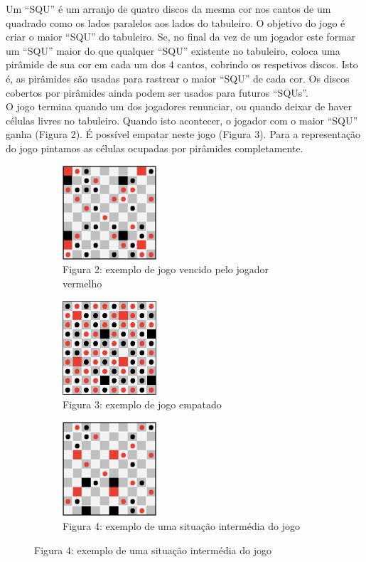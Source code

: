 \documentclass[11pt]{article}
\begin{document}
Um “SQU” é um arranjo de quatro discos da mesma cor nos cantos de um quadrado como os lados paralelos aos lados do tabuleiro. O objetivo do jogo é criar o maior “SQU” do tabuleiro. Se, no final da vez de um jogador este formar um “SQU” maior do que qualquer “SQU” existente no tabuleiro, coloca uma pirâmide de sua cor em cada um dos 4 cantos, cobrindo os respetivos discos. Isto é, as pirâmides são usadas para rastrear o maior “SQU” de cada cor. Os discos cobertos por pirâmides ainda podem ser usados para futuros “SQUs”.\\

O jogo termina quando um dos jogadores renunciar, ou quando deixar de haver células livres no tabuleiro. Quando isto acontecer, o jogador com o maior “SQU” ganha (Figura 2). É possível empatar neste jogo (Figura 3). Para a representação do jogo pintamos as células ocupadas por pirâmides completamente.


\begin{figure}[h]
\begin{center}
\begin{subfigure}[b]{0.3\textwidth}
\includegraphics[width=0.9\linewidth, height=3.5cm]{fig2.png}
\caption*{Figura 2: exemplo de jogo vencido pelo jogador vermelho}
\end{subfigure}
\begin{subfigure}[b]{0.3\textwidth}
\includegraphics[width=0.9\linewidth, height=3.5cm]{fig3.png}
\caption*{Figura 3: exemplo de jogo empatado}
\end{subfigure}
\begin{subfigure}[b]{0.3\textwidth}
\includegraphics[width=0.9\linewidth, height=3.5cm]{fig4.png}
\caption*{Figura 4: exemplo de uma situação intermédia do jogo}
\end{subfigure}
\end{center}
\end{figure}
\end{document}

